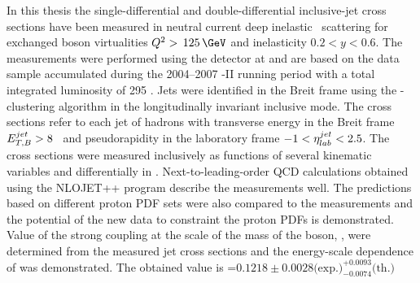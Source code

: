 In this thesis the single-differential and double-differential inclusive-jet cross sections have been measured in neutral current deep inelastic \ep\, scattering for exchanged boson virtualities $\qsq>\,125\,\GeV$ and inelasticity $0.2<y<0.6$. The measurements were performed using the \zeus detector at \hera and are based on the data sample accumulated during the 2004--2007 \hera-II running period with a total integrated luminosity of 295 \invpb. Jets were identified in the Breit frame using the \kt-clustering algorithm in the longitudinally invariant inclusive mode. The cross sections refer to each jet of hadrons with transverse energy in the Breit frame $\mbox{$E_{T,B}^{jet}$} > 8$ \GeV\, and pseudorapidity in the laboratory frame $-1<\mbox{$\eta^{jet}_{lab}$}<2.5$. The cross sections were measured inclusively as functions of several kinematic variables and differentially in \qsq. Next-to-leading-order QCD calculations obtained using the NLOJET++ program describe the measurements well. The predictions based on different proton PDF sets were also compared to the measurements and the potential of the new data to constraint the proton PDFs is demonstrated. Value of the strong coupling at the scale of the mass of the \zn boson, \asz, were determined from the measured jet cross sections and the energy-scale dependence of \as was demonstrated. The obtained value is \asz=$0.1218\pm 0.0028\text{(exp.)}^{+0.0093}_{-0.0074}\text{(th.)}$